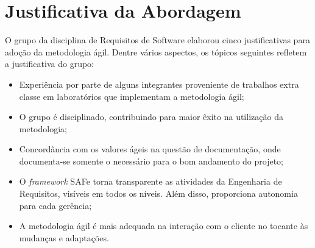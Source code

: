 \chapter[Justificativa da Abordagem]{Justificativa da Abordagem}
\label{chap:justificativa}
	O grupo da disciplina de Requisitos de Software elaborou cinco justificativas para adoção da metodologia ágil. Dentre vários aspectos, os tópicos seguintes refletem a justificativa do grupo:
	\begin{itemize}
		\item{Experiência por parte de alguns integrantes proveniente de trabalhos extra classe em laboratórios que implementam a metodologia ágil;}
		\item{O grupo é disciplinado, contribuindo para maior êxito na utilização da metodologia;}
		\item{Concordância com os valores ágeis na questão de documentação, onde documenta-se somente o necessário para o bom andamento do projeto;}
		\item{O \emph{framework} SAFe torna transparente as atividades da Engenharia de Requisitos, visíveis em todos os níveis. Além disso, proporciona autonomia para cada gerência;}
		\item{A metodologia ágil é mais adequada na interação com o cliente no tocante às mudanças e adaptações.}
	\end{itemize}